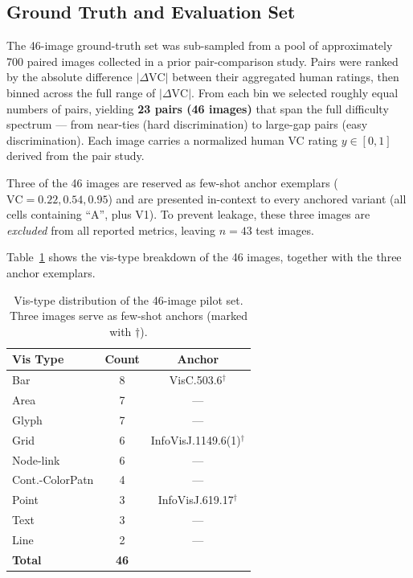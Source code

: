 \subsection{Ground Truth and Evaluation Set}
\label{app:vc-gt}

The 46-image ground-truth set was sub-sampled from a pool of approximately
700 paired images collected in a prior pair-comparison study. Pairs were
ranked by the absolute difference $|\Delta \mathrm{VC}|$ between their
aggregated human ratings, then binned across the full range of
$|\Delta \mathrm{VC}|$. From each bin we selected roughly equal numbers of
pairs, yielding \textbf{23 pairs (46 images)} that span the full difficulty
spectrum --- from near-ties (hard discrimination) to large-gap pairs (easy
discrimination). Each image carries a normalized human VC rating
$y \in [0, 1]$ derived from the pair study.

Three of the 46 images are reserved as few-shot anchor exemplars
($\mathrm{VC} = 0.22, 0.54, 0.95$) and are presented in-context to every
anchored variant (all cells containing ``A'', plus V1). To prevent leakage,
these three images are \emph{excluded} from all reported metrics, leaving
$n = 43$ test images.

Table~\ref{tab:vistype-dist} shows the vis-type breakdown of the 46 images,
together with the three anchor exemplars.

\begin{table}[h]
  \centering
  \caption{Vis-type distribution of the 46-image pilot set. Three images
    serve as few-shot anchors (marked with $\dagger$).}
  \label{tab:vistype-dist}
  \small
  \begin{tabular*}{\linewidth}{@{\extracolsep{\fill}}lcc@{}}
    \toprule
    Vis Type & Count & Anchor \\
    \midrule
    Bar             & 8 & VisC.503.6$^\dagger$ \\
    Area            & 7 & --- \\
    Glyph           & 7 & --- \\
    Grid            & 6 & InfoVisJ.1149.6(1)$^\dagger$ \\
    Node-link       & 6 & --- \\
    Cont.-ColorPatn & 4 & --- \\
    Point           & 3 & InfoVisJ.619.17$^\dagger$ \\
    Text            & 3 & --- \\
    Line            & 2 & --- \\
    \midrule
    \textbf{Total}  & \textbf{46} & \\
    \bottomrule
  \end{tabular*}
\end{table}

